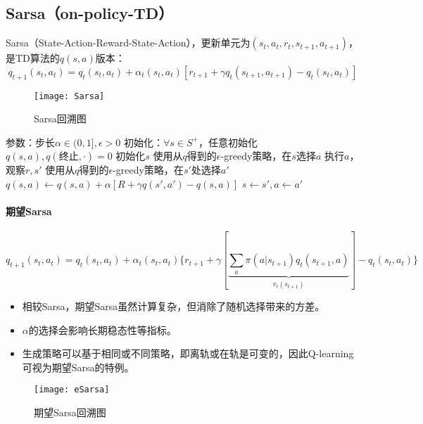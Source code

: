 \documentclass[
12pt, %
a4paper, 
oneside, %
headinclude,footinclude, %
]{scrartcl}
\begin{document}
\subsection[Sarsa]{Sarsa（on-policy-TD）}
Sarsa（State-Action-Reward-State-Action），更新单元为$ (s_t, a_t, r_t, s_{t + 1}, a_{t + 1}) $，是TD算法的$ q(s, a) $版本：
$$ q_{t + 1}(s_t, a_t) = q_t(s_t, a_t) + \alpha_t(s_t, a_t)[r_{t + 1} + \gamma q_t(s_{t + 1}, a_{t + 1}) - q_t(s_t, a_t)] $$

\begin{figure}[H]
\centering
\texttt{[image: Sarsa]}
\caption{Sarsa回溯图}
\end{figure}
\begin{myalgorithm}
\State 参数：步长$ \alpha \in (0,1], \epsilon > 0 $
\State 初始化：$ \forall s \in S^+ $，任意初始化$ q(s,a), q(\text{终止}, \cdot) = 0 $
\State 初始化$ s $
\State 使用从$ q $得到的$ \epsilon $-greedy策略，在$ s $选择$ a $
\State 执行$ a $，观察$ r, s' $
\State 使用从$ q $得到的$ \epsilon$-greedy策略，在$ s' $处选择$ a' $
\State $ q(s, a) \gets q(s, a) + \alpha [R + \gamma q(s', a') - q(s, a)] $
\State $ s \gets s', a \gets a' $
\EndWhile
\EndFor
\end{myalgorithm}
\paragraph{期望Sarsa}
$$ q_{t + 1}(s_t, a_t) = q_t(s_t, a_t) + \alpha_t(s_t, a_t)\{r_{t + 1} + \gamma[\underbrace{\sum_a \pi(a|s_{t + 1}) q_t(s_{t + 1}, a)}_{v_t(s_{t + 1})}] - q_t(s_t, a_t)\} $$

\noindent
\begin{minipage}{0.7\textwidth}
\begin{itemize}
\item 相较Sarsa，期望Sarsa虽然计算复杂，但消除了随机选择带来的方差。
\item $ \alpha $的选择会影响长期稳态性等指标。
\item 生成策略可以基于相同或不同策略，即离轨或在轨是可变的，因此Q-learning可视为期望Sarsa的特例。
\end{itemize}
\end{minipage}
\begin{minipage}{0.3\textwidth}
\begin{figure}[H]
\centering
\texttt{[image: eSarsa]}
\caption{期望Sarsa回溯图}
\end{figure}
\end{minipage}
\end{document}
